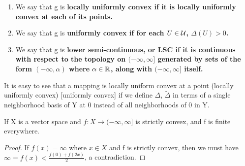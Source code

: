 \begin{df}
\begin{enumerate}
        \item We say that g is \bf locally uniformly convex \rm if it is \bf locally uniformly convex \rm  at each of its points. 
        \item We say that g is \bf uniformly convex \rm if for each $U \in \mathcal{U}$, $\Delta(U)>0$. 
        \item We say that g is \bf lower semi-continuous\rm, or LSC if it is continuous with respect to the topology on $(-\infty, \infty]$ generated by sets of the form $(-\infty,\alpha)$ where $\alpha \in \mathbb{R}$, along with $(-\infty,\infty]$ itself. 
    \end{enumerate} 
\end{df} 
\begin{rmk}
    It is easy to see that a mapping is locally uniform convex at a point (locally uniformly convex) [uniformly convex] if we define $\Delta$, $\tilde{\Delta}$ in terms of a single neighborhood basis of Y at 0 instead of all neighborhoods of 0 in Y.
\end{rmk} 

\begin{rmk}
    \label{rmk:strictlyconvexrealvalued}If X is a vector space and $f:X \to (-\infty,\infty]$ is strictly convex, and f is finite everywhere.
    \begin{proof}
        If $f(x)= \infty$  where $x \in X$ and f is strictly convex, then we must have $\infty = f(x) < \frac{f(0)+f(2x)}{2}$, a contradiction. 
    \end{proof} 
\end{rmk} 

